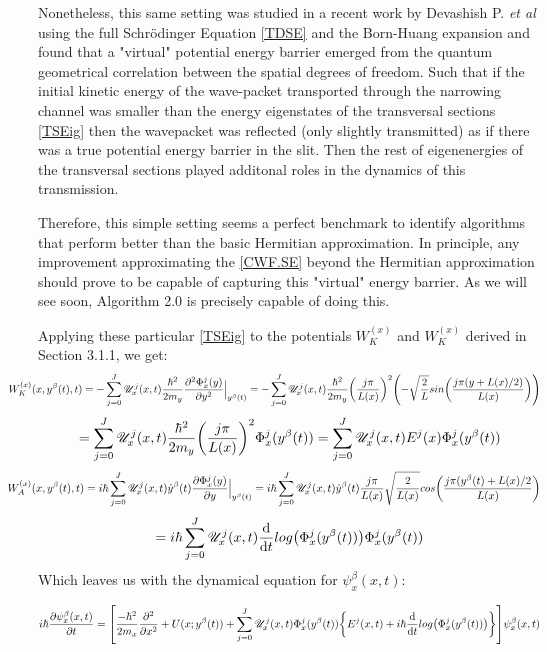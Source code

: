 \documentclass[11pt, a4paper]{article} %
\newcommand{\U}{\mathscr{U}}
\begin{document}
Nonetheless, this same setting was studied in a recent work by Devashish P. {\em et al} \cite{Dev} using the full Schrödinger Equation \ref{TDSE} and the Born-Huang expansion and found that a "virtual" potential energy barrier emerged from the quantum geometrical correlation between the spatial degrees of freedom. Such that if the initial kinetic energy of the wave-packet transported through the narrowing channel was smaller than the energy eigenstates of the transversal sections \ref{TSEig} then the wavepacket was reflected (only slightly transmitted) as if there was a true potential energy barrier in the slit. Then the rest of eigenenergies of the transversal sections played additonal roles in the dynamics of this transmission. 

Therefore, this simple setting seems a perfect benchmark to identify algorithms that perform better than the basic Hermitian approximation. In principle, any improvement approximating the \ref{CWF.SE} beyond the Hermitian approximation should prove to be capable of capturing this "virtual" energy barrier. As we will see soon, Algorithm 2.0 is precisely capable of doing this. 

Applying these particular \ref{TSEig} to the potentials $W_K^{(x)}$ and $W_K^{(x)}$ derived in Section 3.1.1, we get:
$$
\hspace{-1cm} W_K^{(x)}(x,y^\beta(t),t)= -\sum_{j=0}^J \U^j_x(x,t)\frac{\hbar^2}{2m_y}\pdv[2]{\Phi^j_x(y)}{y}\Big\rvert_{y^\beta(t)} = -\sum_{j=0}^J \U^j_x(x,t)\frac{\hbar^2}{2m_y}\qty(\frac{j\pi}{L(x)})^2\qty(- \sqrt{\frac{2}{L}} sin\qty( \frac{j\pi (y+L(x)/2)}{L(x)} ))
$$
$$
=\sum_{j=0}^J  \U^j_x(x,t)\frac{\hbar^2}{2m_y}\qty(\frac{j\pi}{L(x)})^2 \Phi^j_x(y^\beta(t))= \sum_{j=0}^J  \U^j_x(x,t)E^j(x) \Phi^j_x(y^\beta(t))
$$
$$
\hspace{-1cm} W_A^{(x)}(x,y^\beta(t),t)=i\hbar\sum_{j=0}^J \U^j_x(x,t)\dot{y}^\beta(t)\pdv{\Phi^j_x(y)}{y}\Big\rvert_{y^\beta(t)}= i\hbar\sum_{j=0}^J \U^j_x(x,t)\dot{y}^\beta(t) \frac{j\pi}{L(x)} \sqrt{\frac{2}{L(x)}}cos\qty(\frac{j\pi (y^\beta(t)+L(x)/2}{L(x)})
$$
$$
=i\hbar \sum_{j=0}^J\U^j_x(x,t) \dv{}{t}log\qty(\Phi^j_x(y^\beta(t))) \Phi^j_x(y^\beta(t))
$$%
Which leaves us with the dynamical equation for $\psi^\beta_x(x,t)$:

$$
i\hbar \pdv{\psi^\beta_x(x,t)}{t}=\qty[ \frac{-\hbar^2}{2m_x}\pdv[2]{}{x} + U(x;y^\beta(t))+\sum_{j=0}^J \U^j_x(x,t)\Phi^j_x(y^\beta(t))\qty{ E^j(x,t)+i\hbar\dv{}{t}log\qty(\Phi^j_x(y^\beta(t)))} ]\psi^\beta_x(x,t)
$$
\end{document}
